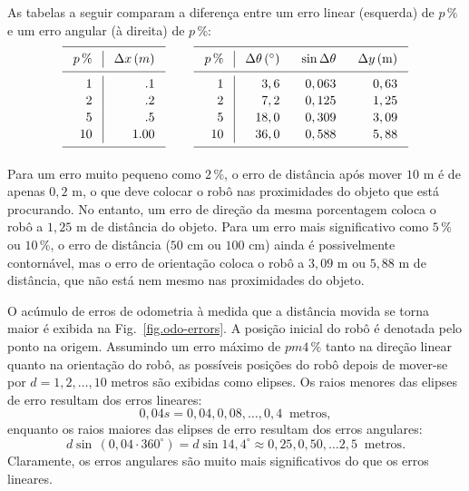 As tabelas a seguir comparam a diferença entre um erro linear (esquerda) de $p\,\%$ e um erro angular (à direita) de $p\,\%$:
\begin{displaymath}
\setlength{\arraycolsep}{2ex}
\renewcommand{\arraystretch}{1.1}
\begin{array}{r|r}
\hline\noalign{\smallskip}
\multicolumn{1}{c|}{p\,\%} & \multicolumn{1}{c}{\Delta x \,(m)}\\
\noalign{\smallskip}\hline\noalign{\smallskip}
1 & .1 \\
2 & .2 \\
5 & .5 \\
10 & 1.00\\
\noalign{\smallskip}\hline\noalign{\smallskip}
\end{array}
\;\;\;\;\;\;\;\;
\begin{array}{r|rrr}
\hline\noalign{\smallskip}
\multicolumn{1}{c|}{p\,\%} & \multicolumn{1}{c}{\Delta \theta\,({}^\circ)} & \multicolumn{1}{c}{\sin\Delta\theta} & \multicolumn{1}{c}{\Delta y \,(\textrm{m})}\\
\noalign{\smallskip}\hline\noalign{\smallskip}
1 &  3,6 & 0,063 & 0,63\\
2 &  7,2 & 0,125 & 1,25\\
5 &  18,0 & 0,309 & 3,09\\
10 & 36,0 & 0,588 & 5,88\\
\noalign{\smallskip}\hline\noalign{\smallskip}
\end{array}
\end{displaymath}

Para um erro muito pequeno como $2\,\%$, o erro de distância após mover $10$ m é de apenas $0,2$ m, o que deve colocar o robô nas proximidades do objeto que está procurando. No entanto, um erro de direção da mesma porcentagem coloca o robô a $1,25$ m de distância do objeto. Para um erro mais significativo como $5\,\%$ ou $10\,\%$, o erro de distância ($50$ cm ou $100$ cm) ainda é possivelmente contornável, mas o erro de orientação coloca o robô a $3,09$ m ou $5,88$ m de distância, que não está nem mesmo nas proximidades do objeto.

O acúmulo de erros de odometria à medida que a distância movida se torna maior é exibida na Fig.~\ref{fig.odo-errors}. A posição inicial do robô é denotada pelo ponto na origem.  Assumindo um erro máximo de $pm 4\,\%$ tanto na direção linear quanto na orientação do robô, as possíveis posições do robô depois de mover-se por $d=1,2,\ldots,10$ metros são exibidas como elipses. Os raios menores das elipses de erro resultam dos erros lineares:
\[0,04s = 0,04, 0,08, \ldots, 0,4 \;\;\textrm{metros},
\]
enquanto os raios maiores das elipses de erro resultam dos erros angulares:
\[
d\sin \,(0,04\cdot 360^\circ)=d \sin 14,4^\circ \approx{} 0,25, 0,50, \ldots 2,5\;\;\textrm{metros}.
\]
Claramente, os erros angulares são muito mais significativos do que os erros lineares.

